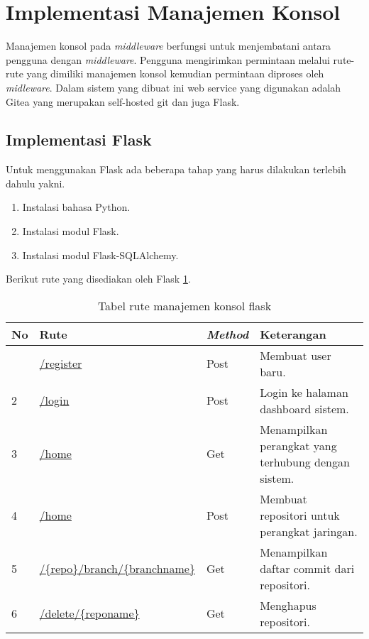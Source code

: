    	\section{Implementasi Manajemen Konsol}
   		Manajemen konsol pada \textit{middleware} berfungsi untuk menjembatani antara pengguna dengan \textit{middleware}. Pengguna mengirimkan permintaan melalui rute-rute yang dimiliki manajemen konsol kemudian permintaan diproses oleh \textit{midleware}. Dalam sistem yang dibuat ini web service yang digunakan adalah Gitea yang merupakan self-hosted git dan juga Flask. 
   		
   		\subsection{Implementasi Flask}
   		Untuk menggunakan Flask ada beberapa tahap yang harus dilakukan terlebih dahulu yakni. 
   		\begin{enumerate}
   			\item Instalasi bahasa Python.
   			\item Instalasi modul Flask.
   			\item Instalasi modul Flask-SQLAlchemy.
   		\end{enumerate}
   		
   		Berikut rute yang disediakan oleh Flask \ref{tabelRuteFlaskApi}.
   		\begin{longtable}{|p{}|p{}|p{}|p{}|}
   			
   			\caption{Tabel rute manajemen konsol flask} \label{tabelRuteFlaskApi} \\
   			\hline
   			\textbf{No} & \textbf{Rute} & \textbf{\textit{Method}} & \textbf{Keterangan} \\ \hline
   			\endfirsthead
   		
   		
   		
   			\endhead
   			\endfoot
   			\endlastfoot
   			1 & \url{/register} & Post & Membuat user baru. \\ \hline
   			2 & \url{/login} & Post & Login ke halaman dashboard sistem. \\ \hline
   			3 & \url{/home} & Get & Menampilkan perangkat yang terhubung dengan sistem. \\ \hline
   			4 & \url{/home} & Post & Membuat repositori untuk perangkat jaringan. \\ \hline	
   			5 & \url{/{repo}/branch/{branchname}} & Get & Menampilkan daftar commit dari repositori.\\ \hline	
   			6 & \url{/delete/{reponame}} & Get & Menghapus repositori.\\ \hline
   			
   		\end{longtable}
   		
